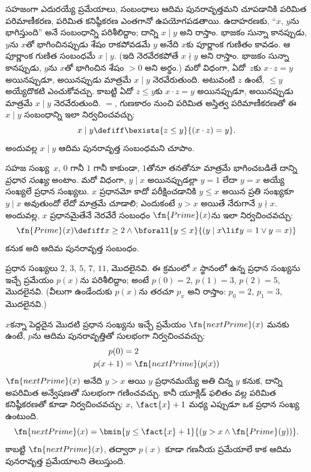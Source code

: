 \documentclass[../../../include/open-logic-section]{subfiles}
\begin{document}

సహజంగా ఎదురయ్యే ప్రమేయాలు, సంబంధాలు ఆదిమ పునరావృత్తమని చూపడానికి
పరిమిత పరిమాణీకరణ, పరిమిత కనిష్ఠీకరణ ఎంతగానో ఉపయోగపడతాయి. ఉదాహరణకు,
``$x$, $y$ను భాగిస్తుంది'' అనే సంబంధాన్ని పరిశీలిద్దాం; దాన్ని
$x\mid y$ అని రాస్తాం. భాజకం సున్నా కానప్పుడు, $y$ను $x$తో భాగించినప్పుడు
శేషం రాకపోవడమే $y$ అనేది $x$కు పూర్ణాంక గుణితం కావడం. ఆ పూర్ణాంక
గుణిత సంబంధమే $x\mid y$. (ఇది నెరవేరకపోతే $x\nmid y$ అని రాస్తాం.
భాజకం సున్నా కానప్పుడు, $y$ను $x$తో భాగించిన శేషం $>0$ అని అర్థం.) మరో విధంగా, ఏదో~$z$కు $x\cdot z=y$
అయినప్పుడూ, అయినప్పుడు మాత్రమే $x\mid y$ నెరవేరుతుంది. అటువంటి $z$ ఉంటే, $\leq y$ అయ్యేదొకటి ఎంచుకోవచ్చు.
కాబట్టి ఏదో $z\le y$కు $x\cdot z=y$ అయినప్పుడూ, అయినప్పుడు మాత్రమే $x\mid y$ నెరవేరుతుంది.
$=$, గుణకారం నుంచి పరిమిత అస్తిత్వ పరిమాణీకరణతో ఈ $x\mid y$
సంబంధాన్ని ఇలా
నిర్వచించవచ్చు:
\[
x \mid y \defiff \bexists{z \leq y}{(x \cdot z) = y}.
\]
అందువల్ల $x\mid y$ ఆదిమ పునరావృత్త సంబంధమని చూపాం.

సహజ సంఖ్య~$x$, $0$ గానీ $1$ గానీ కాకుండా, $1$తోనూ తనతోనూ మాత్రమే
భాగించబడితే దాన్ని \emph{ప్రధాన సంఖ్య} అంటాం. మరో విధంగా, $y\mid x$
అయినప్పుడల్లా $y=1$ లేదా $y=x$ అయ్యే సంఖ్యలే ప్రధాన సంఖ్యలు. $x$
ప్రధానమో కాదో పరీక్షించడానికి $y\le x$ అయిన ప్రతి సంఖ్యకూ $y\mid x$
అవుతుందో లేదో మాత్రమే చూడాలి; ఎందుకంటే $y>x$ అయితే నేరుగానే
$y\nmid x$. అందువల్ల, $x$ ప్రధానమైతేనే నెరవేరే సంబంధం
$\fn{Prime}(x)$ను ఇలా నిర్వచించవచ్చు:
\[
\fn{Prime}(x) \defiff x \geq 2 \land \bforall{y \leq x}{(y \mid x \lif y
  = 1 \lor y = x)}
\]
కనుక అది ఆదిమ పునరావృత్త సంబంధం.

ప్రధాన సంఖ్యలు $2$, $3$, $5$, $7$, $11$, మొదలైనవి. ఈ క్రమంలో
$x$ స్థానంలో ఉన్న ప్రధాన సంఖ్యను ఇచ్చే ప్రమేయం $p(x)$ను పరిశీలిద్దాం;
అంటే $p(0)=2$, $p(1)=3$, $p(2)=5$, మొదలైనవి. (వీలుగా ఉండేందుకు
$p(x)$ను తరచూ $p_x$ అని రాస్తాం: $p_0=2$, $p_1=3$, మొదలైనవి.)

$x$కన్నా పెద్దదైన మొదటి ప్రధాన సంఖ్యను ఇచ్చే ప్రమేయం
$\fn{nextPrime}(x)$ మనకు ఉంటే, $p$ను ఆదిమ పునరావృత్తితో సులభంగా
నిర్వచించవచ్చు:
\begin{align*}
  p(0) & = 2\\
  p(x+1) & = \fn{nextPrime}(p(x))
\end{align*}
$\fn{nextPrime}(x)$ అనేది $y>x$ అయి $y$ ప్రధానమయ్యే అతి చిన్న $y$
కనుక, దాన్ని అపరిమిత అన్వేషణతో సులభంగా గణించవచ్చు. కానీ యూక్లిడ్
ఫలితం వల్ల పరిమిత కనిష్ఠీకరణతో కూడా నిర్వచించవచ్చు: $x$, $\fact{x}+1$
మధ్య ఎప్పుడూ ఒక ప్రధాన సంఖ్య ఉంటుంది.
\[
  \fn{nextPrime}(x) =
  \bmin{y \leq \fact{x}+1}{(y > x \land \fn{Prime}(y))}.
\]
కాబట్టి $\fn{nextPrime}(x)$, తద్వారా $p(x)$ కూడా గణనీయ ప్రమేయాలే కాక
ఆదిమ పునరావృత్త ప్రమేయాలని తెలుస్తుంది.
\end{document}
